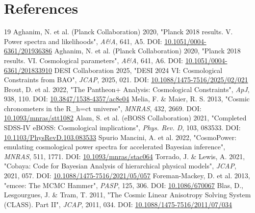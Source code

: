 \documentclass[11pt,a4paper]{article}
\begin{document}
\section{References}
\begin{thebibliography}{19}
 Aghanim, N. et al. (Planck Collaboration) 2020, "Planck 2018 results. V. Power spectra and likelihoods", \emph{A\&A}, 641, A5. DOI: \href{https://doi.org/10.1051/0004-6361/201936386}{10.1051/\allowbreak{}0004-6361/\allowbreak{}201936386}
 Aghanim, N. et al. (Planck Collaboration) 2020, "Planck 2018 results. VI. Cosmological parameters", \emph{A\&A}, 641, A6. DOI: \href{https://doi.org/10.1051/0004-6361/201833910}{10.1051/\allowbreak{}0004-6361/\allowbreak{}201833910}
 DESI Collaboration 2025, "DESI 2024 VI: Cosmological Constraints from BAO", \emph{JCAP}, 2025, 021. DOI: \href{https://doi.org/10.1088/1475-7516/2025/02/021}{10.1088/\allowbreak{}1475-7516/\allowbreak{}2025/\allowbreak{}02/\allowbreak{}021}
 Brout, D. et al. 2022, "The Pantheon+ Analysis: Cosmological Constraints", \emph{ApJ}, 938, 110. DOI: \href{https://doi.org/10.3847/1538-4357/ac8e04}{10.3847/\allowbreak{}1538-4357/\allowbreak{}ac8e04}
 Melia, F. \& Maier, R. S. 2013, "Cosmic chronometers in the R\_\allowbreak{}h=ct universe", \emph{MNRAS}, 432, 2669. DOI: \href{https://doi.org/10.1093/mnras/stt1082}{10.1093/\allowbreak{}mnras/\allowbreak{}stt1082}
 Alam, S. et al. (eBOSS Collaboration) 2021, "Completed SDSS-IV eBOSS: Cosmological implications", \emph{Phys. Rev. D}, 103, 083533. DOI: \href{https://doi.org/10.1103/PhysRevD.103.083533}{10.1103/\allowbreak{}PhysRevD.103.083533}
 Spurio Mancini, A. et al. 2022, "CosmoPower: emulating cosmological power spectra for accelerated Bayesian inference", \emph{MNRAS}, 511, 1771. DOI: \href{https://doi.org/10.1093/mnras/stac064}{10.1093/\allowbreak{}mnras/\allowbreak{}stac064}
 Torrado, J. \& Lewis, A. 2021, "Cobaya: Code for Bayesian Analysis of hierarchical physical models", \emph{JCAP}, 2021, 057. DOI: \href{https://doi.org/10.1088/1475-7516/2021/05/057}{10.1088/\allowbreak{}1475-7516/\allowbreak{}2021/\allowbreak{}05/\allowbreak{}057}
 Foreman-Mackey, D. et al. 2013, "emcee: The MCMC Hammer", \emph{PASP}, 125, 306. DOI: \href{https://doi.org/10.1086/670067}{10.1086/\allowbreak{}670067}
 Blas, D., Lesgourgues, J. \& Tram, T. 2011, "The Cosmic Linear Anisotropy Solving System (CLASS). Part II", \emph{JCAP}, 2011, 034. DOI: \href{https://doi.org/10.1088/1475-7516/2011/07/034}{10.1088/\allowbreak{}1475-7516/\allowbreak{}2011/\allowbreak{}07/\allowbreak{}034}

\end{thebibliography}
\end{document}
